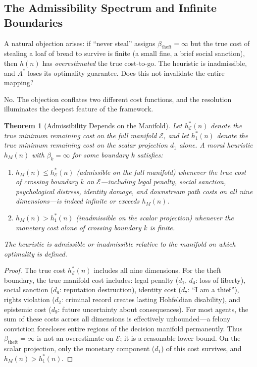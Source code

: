 \documentclass[12pt]{article}
\newtheorem{theorem}{Theorem}[section]
\theoremstyle{definition}
\theoremstyle{remark}
\newcommand{\E}{\mathcal{E}}               %
\begin{document}
\subsection{The Admissibility Spectrum and Infinite Boundaries}
\label{sec:admissibility_spectrum}

A natural objection arises: if ``never steal'' assigns $\beta_{\text{theft}} = \infty$ but the true cost of stealing a loaf of bread to survive is finite (a small fine, a brief social sanction), then $h(n)$ has \emph{overestimated} the true cost-to-go.  The heuristic is inadmissible, and $A^*$ loses its optimality guarantee.  Does this not invalidate the entire mapping?

No.  The objection conflates two different cost functions, and the resolution illuminates the deepest feature of the framework.

\begin{theorem}[Admissibility Depends on the Manifold]
\label{thm:admissibility_manifold}
Let $h^*_\E(n)$ denote the true minimum remaining cost on the full manifold $\E$, and let $h^*_1(n)$ denote the true minimum remaining cost on the scalar projection $d_1$ alone.  A moral heuristic $h_M(n)$ with $\beta_k = \infty$ for some boundary $k$ satisfies:
\begin{enumerate}
    \item $h_M(n) \leq h^*_\E(n)$ (admissible on the full manifold) whenever the true cost of crossing boundary $k$ on $\E$---including legal penalty, social sanction, psychological distress, identity damage, and downstream path costs on all nine dimensions---is indeed infinite or exceeds $h_M(n)$.
    \item $h_M(n) > h^*_1(n)$ (inadmissible on the scalar projection) whenever the monetary cost alone of crossing boundary $k$ is finite.
\end{enumerate}
The heuristic is admissible or inadmissible \emph{relative to the manifold on which optimality is defined}.
\end{theorem}

\begin{proof}
The true cost $h^*_\E(n)$ includes all nine dimensions.  For the theft boundary, the true manifold cost includes: legal penalty ($d_1$, $d_4$: loss of liberty), social sanction ($d_6$: reputation destruction), identity cost ($d_7$: ``I am a thief''), rights violation ($d_2$: criminal record creates lasting Hohfeldian disability), and epistemic cost ($d_9$: future uncertainty about consequences).  For most agents, the sum of these costs across all dimensions is effectively unbounded---a felony conviction forecloses entire regions of the decision manifold permanently.  Thus $\beta_{\text{theft}} = \infty$ is not an overestimate on $\E$; it is a reasonable lower bound.  On the scalar projection, only the monetary component ($d_1$) of this cost survives, and $h_M(n) > h^*_1(n)$.
\end{proof}
\end{document}
